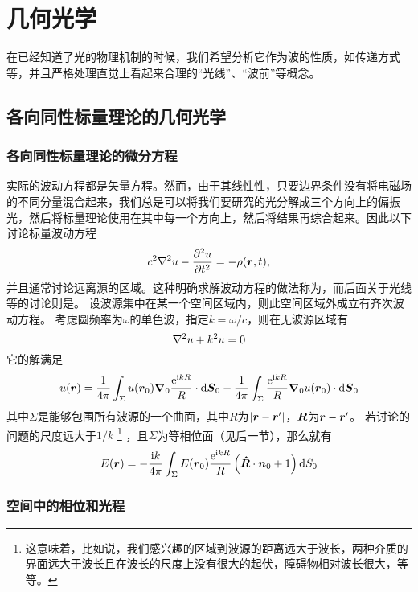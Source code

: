 \chapter{几何光学}

在已经知道了光的物理机制的时候，我们希望分析它作为波的性质，如传递方式等，并且严格处理直觉上看起来合理的“光线”、“波前”等概念。

\section{各向同性标量理论的几何光学}\label{sec:isotropic-scalar}

\subsection{各向同性标量理论的微分方程}

实际的波动方程都是矢量方程。然而，由于其线性性，只要边界条件没有将电磁场的不同分量混合起来，我们总是可以将我们要研究的光分解成三个方向上的偏振光，然后将标量理论使用在其中每一个方向上，然后将结果再综合起来。因此以下讨论标量波动方程
\[
    c^2 \laplacian u - \pdv[2]{u}{t} = - \rho(\vb*{r}, t),
\]
并且通常讨论远离源的区域。这种明确求解波动方程的做法称为，而后面关于光线等的讨论则是。
设波源集中在某一个空间区域内，则此空间区域外成立有齐次波动方程。
考虑圆频率为$\omega$的单色波，指定$k = \omega / c$，则在无波源区域有
\[
    \laplacian u + k^2 u = 0
\]
它的解满足
\[
    u(\vb*{r}) = 
    \frac{1}{4\pi} \int_{\Sigma} u(\vb*{r}_0) \grad_0{\frac{\mathrm{e}^{\mathrm{i} k R}}{R}} \cdot \dd \vb*{S}_0 
    - \frac{1}{4\pi} \int_{\Sigma} \frac{\mathrm{e}^{\mathrm{i} k R}}{R} \grad_0{u(\vb*{r}_0)} \cdot \dd{\vb*{S}_0}
\]
其中$\Sigma$是能够包围所有波源的一个曲面，其中$R$为$\abs{\vb*{r} - \vb*{r}'}$，$\vb*{R}$为$\vb*{r} - \vb*{r}'$。
若讨论的问题的尺度远大于$1/k$%
\footnote{这意味着，比如说，我们感兴趣的区域到波源的距离远大于波长，两种介质的界面远大于波长且在波长的尺度上没有很大的起伏，障碍物相对波长很大，等等。}
，且$\Sigma$为等相位面（见后一节），那么就有
\begin{equation}
    E(\vb*{r}) = - \frac{\mathrm{i} k}{4\pi} \int_\Sigma E(\vb*{r}_0) \frac{\mathrm{e}^{\mathrm{i} k R}}{R} \left( \vu*{R} \cdot \vb*{n}_0 + 1 \right) \dd{S_0}
    \label{eq:kirchhoff-formula}
\end{equation}

\subsection{空间中的相位和光程}\label{sec:phrase-and-l}

